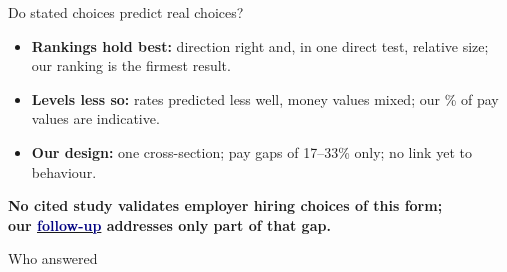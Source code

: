 \begin{frame}[t,label=B-validity]{Do stated choices predict real choices?}
\begin{itemize}
    \item \textbf{Rankings hold best:} direction right and, in one direct test, relative size; our ranking is the firmest result.
    \item \textbf{Levels less so:} rates predicted less well, money values mixed; our \% of pay values are indicative.
    \item \textbf{Our design:} one cross-section; pay gaps of 17--33\% only; no link yet to behaviour.
  \end{itemize}
  \vspace{0.10cm}
  {\fontsize{9}{11}\selectfont\RaggedRight\color{Ink}\textbf{No cited study validates employer hiring choices of this form;\\ our \hyperlink{B-followup}{\textcolor{Navy}{follow-up}} addresses only part of that gap.}\par}
\end{frame}

\begin{frame}[t,label=B-sample]{Who answered}
  \FrameTop
\end{frame}


